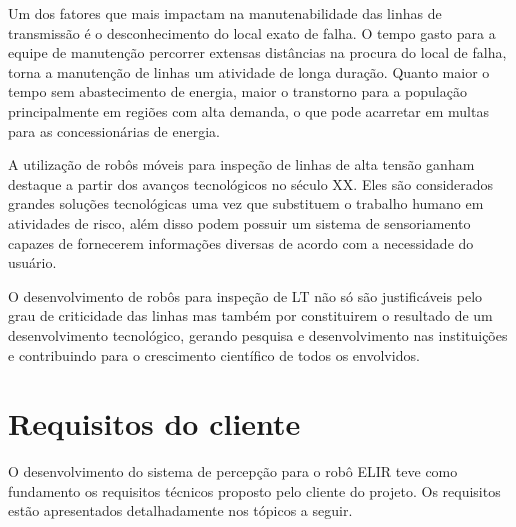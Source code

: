 Um dos fatores que mais impactam na manutenabilidade das linhas de transmissão é o desconhecimento do local exato de falha. O tempo gasto para a equipe de manutenção percorrer extensas distâncias na procura do local de falha, torna a manutenção de linhas um atividade de longa duração. Quanto maior o tempo sem abastecimento de energia, maior o transtorno para a população principalmente em regiões com alta demanda, o que pode acarretar em multas para as concessionárias de energia.

A utilização de robôs móveis para inspeção de linhas de alta tensão ganham destaque a partir dos avanços tecnológicos no século XX. Eles são considerados grandes soluções tecnológicas uma vez que substituem o trabalho humano em atividades de risco, além disso podem possuir um sistema de sensoriamento capazes de fornecerem informações diversas de acordo com a necessidade do usuário.

O desenvolvimento de robôs para inspeção de LT não só são justificáveis pelo grau de criticidade das linhas mas também por constituirem o resultado de um desenvolvimento tecnológico, gerando pesquisa e desenvolvimento nas instituições e contribuindo para o crescimento científico de todos os envolvidos.



\section{Requisitos do cliente}
\label{sec:reqc}

O desenvolvimento do sistema de percepção para o robô ELIR teve como fundamento os requisitos técnicos proposto pelo cliente do projeto. Os requisitos estão apresentados detalhadamente nos tópicos a seguir.
    
